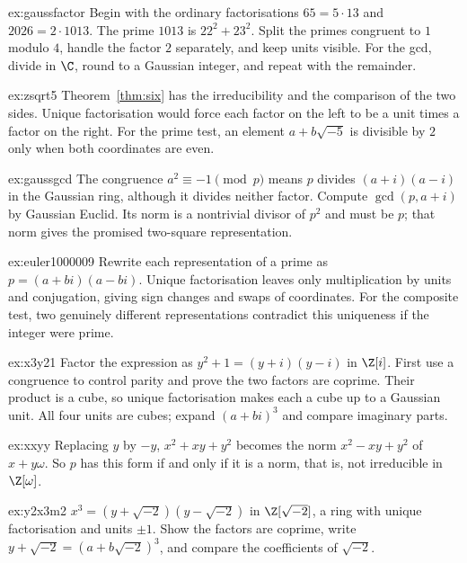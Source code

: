 \begin{hint}{ex:gaussfactor}
Begin with the ordinary factorisations $65=5\cdot13$ and $2026=2\cdot1013$. The prime $1013$ is $22^2+23^2$. Split the primes congruent to $1$ modulo $4$, handle the factor $2$ separately, and keep units visible. For the gcd, divide in $\C$, round to a Gaussian integer, and repeat with the remainder.
\end{hint}
\begin{hint}{ex:zsqrt5}
Theorem~\ref{thm:six} has the irreducibility and the comparison of the two sides. Unique factorisation would force each factor on the left to be a unit times a factor on the right. For the prime test, an element $a+b\sqrt{-5}$ is divisible by $2$ only when both coordinates are even.
\end{hint}
\begin{hint}{ex:gaussgcd}
The congruence $a^2\equiv-1\pmod p$ means $p$ divides $(a+i)(a-i)$ in the Gaussian ring, although it divides neither factor. Compute $\gcd(p,a+i)$ by Gaussian Euclid. Its norm is a nontrivial divisor of $p^2$ and must be $p$; that norm gives the promised two-square representation.
\end{hint}
\begin{hint}{ex:euler1000009}
Rewrite each representation of a prime as $p=(a+bi)(a-bi)$. Unique factorisation leaves only multiplication by units and conjugation, giving sign changes and swaps of coordinates. For the composite test, two genuinely different representations contradict this uniqueness if the integer were prime.
\end{hint}
\begin{hint}{ex:x3y21}
Factor the expression as $y^2+1=(y+i)(y-i)$ in $\Z[i]$. First use a congruence to control parity and prove the two factors are coprime. Their product is a cube, so unique factorisation makes each a cube up to a Gaussian unit. All four units are cubes; expand $(a+bi)^3$ and compare imaginary parts.
\end{hint}
\begin{hint}{ex:xxyy}
Replacing $y$ by $-y$, $x^2+xy+y^2$ becomes the norm $x^2-xy+y^2$ of $x+y\omega$. So $p$ has this form if and only if it is a norm, that is, not irreducible in $\Z[\omega]$.
\end{hint}
\begin{hint}{ex:y2x3m2}
$x^3=(y+\sqrt{-2})(y-\sqrt{-2})$ in $\Z[\sqrt{-2}]$, a ring with unique factorisation and units $\pm1$. Show the factors are coprime, write $y+\sqrt{-2}=(a+b\sqrt{-2})^3$, and compare the coefficients of $\sqrt{-2}$.
\end{hint}

